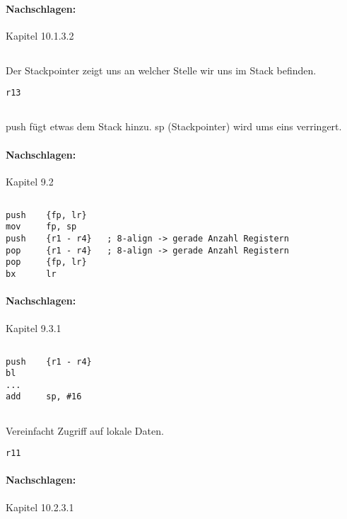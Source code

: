 \paragraph*{Nachschlagen:}
Kapitel 10.1.3.2 

\subsection{}
Der Stackpointer zeigt uns an welcher Stelle wir uns im Stack befinden.
\begin{lstlisting}
r13
\end{lstlisting}

\subsection{}
push{} fügt etwas dem Stack hinzu.
sp (Stackpointer) wird ums eins verringert.
\paragraph*{Nachschlagen:}
Kapitel 9.2

\subsection{}
\begin{lstlisting}
push 	{fp, lr}
mov 	fp, sp
push 	{r1 - r4}	; 8-align -> gerade Anzahl Registern
pop 	{r1 - r4}	; 8-align -> gerade Anzahl Registern
pop		{fp, lr}
bx		lr
\end{lstlisting}
\paragraph*{Nachschlagen:}
Kapitel 9.3.1

\subsection{}
\begin{lstlisting}
push 	{r1 - r4}
bl
...
add		sp, #16
\end{lstlisting}

\subsection{}
Vereinfacht Zugriff auf lokale Daten.
\begin{lstlisting}
r11
\end{lstlisting}
\paragraph*{Nachschlagen:}
Kapitel 10.2.3.1
